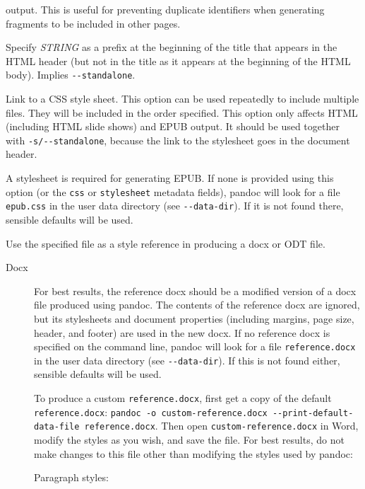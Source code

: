 \documentclass[
]{article}
\begin{document}
\begin{description}
output. This is useful for preventing duplicate identifiers when
generating fragments to be included in other pages.
\item[\texttt{-T} \emph{STRING},
\texttt{-\/-title-prefix=}\emph{STRING}]
Specify \emph{STRING} as a prefix at the beginning of the title that
appears in the HTML header (but not in the title as it appears at the
beginning of the HTML body). Implies \texttt{-\/-standalone}.
\item[\texttt{-c} \emph{URL}, \texttt{-\/-css=}\emph{URL}]
Link to a CSS style sheet. This option can be used repeatedly to include
multiple files. They will be included in the order specified. This
option only affects HTML (including HTML slide shows) and EPUB output.
It should be used together with \texttt{-s/-\/-standalone}, because the
link to the stylesheet goes in the document header.

A stylesheet is required for generating EPUB. If none is provided using
this option (or the \texttt{css} or \texttt{stylesheet} metadata
fields), pandoc will look for a file \texttt{epub.css} in the user data
directory (see \texttt{-\/-data-dir}). If it is not found there,
sensible defaults will be used.
\item[\protect\hypertarget{option--reference-doc}{}{\texttt{-\/-reference-doc=}\emph{FILE}\textbar{}\emph{URL}}]
Use the specified file as a style reference in producing a docx or ODT
file.

\begin{description}
\item[Docx]
For best results, the reference docx should be a modified version of a
docx file produced using pandoc. The contents of the reference docx are
ignored, but its stylesheets and document properties (including margins,
page size, header, and footer) are used in the new docx. If no reference
docx is specified on the command line, pandoc will look for a file
\texttt{reference.docx} in the user data directory (see
\texttt{-\/-data-dir}). If this is not found either, sensible defaults
will be used.

To produce a custom \texttt{reference.docx}, first get a copy of the
default \texttt{reference.docx}:
\texttt{pandoc\ -o\ custom-reference.docx\ -\/-print-default-data-file\ reference.docx}.
Then open \texttt{custom-reference.docx} in Word, modify the styles as
you wish, and save the file. For best results, do not make changes to
this file other than modifying the styles used by pandoc:

Paragraph styles:


\end{description}
\end{description}
\end{document}
